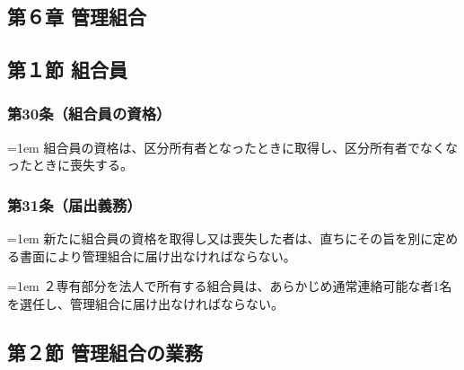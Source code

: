 \documentclass[
  twoside,
  luatex,
  paper=a4paper,
  fontsize=11pt,
  jafontsize=11pt,
  jlreq_notes,
]{jlreq}
\newcommand{\joumain}[1]{%
  \noindent\hangindent=1em\hangafter=1
  \hspace{1em}#1%
}
\newcommand{\kou}[2]{%
  \par\noindent\hangindent=1em\hangafter=1
  #1\hspace{1em}#2%
}
\begin{document}
  \begin{center}
  \subsection*{第６章 管理組合}
  \subsection*{第１節 組合員}
  \end{center}

  \subsubsection*{第30条（組合員の資格）}
  \joumain{組合員の資格は、区分所有者となったときに取得し、区分所有者でなくなったときに喪失する。}

  \subsubsection*{第31条（届出義務）}
  \joumain{新たに組合員の資格を取得し又は喪失した者は、直ちにその旨を別に定める書面により管理組合に届け出なければならない。}
  \kou{２}{専有部分を法人で所有する組合員は、あらかじめ通常連絡可能な者1名を選任し、管理組合に届け出なければならない。}
  
  \begin{center}
  \subsection*{第２節 管理組合の業務}
  \end{center}
\end{document}
